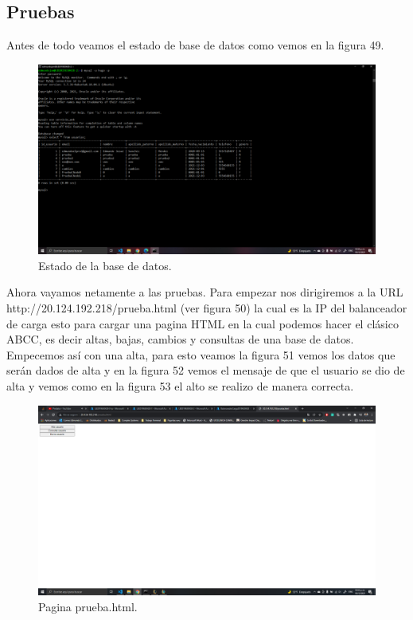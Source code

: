 \documentclass[11pt]{article}
\begin{document}
		\subsection{Pruebas}
		Antes de todo veamos el estado de base de datos como vemos en la figura 49.
		\begin{figure}[H]
				\centering
				\includegraphics[scale=0.34]{resources/estadoDB.png}
				\caption{Estado de la base de datos.}\label{fig:picture}
		\end{figure}
		Ahora vayamos netamente a las pruebas. Para empezar nos dirigiremos a la URL http://20.124.192.218/prueba.html (ver figura 50) la cual es la IP del balanceador de carga esto para cargar una pagina HTML en la cual podemos hacer el clásico ABCC, es decir altas, bajas, cambios y consultas de una base de datos. Empecemos así con una alta, para esto veamos la figura 51 vemos los datos que serán dados de alta y en la figura 52 vemos el mensaje de que el usuario se dio de alta y vemos como en la figura 53 el alto se realizo de manera correcta.
		\begin{figure}[H]
			\centering
			\includegraphics[scale=0.34]{resources/prueba1.png}
			\caption{Pagina prueba.html.}\label{fig:picture}
		\end{figure}
\end{document}
